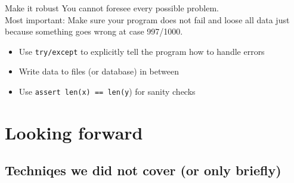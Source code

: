 \begin{frame}{Make it robust}
	You cannot foresee every possible problem.\\
	Most important: Make sure your program does not fail and loose all data just because something goes wrong at case 997/1000.
	\begin{itemize}
		\item Use \texttt{try/except} to explicitly tell the program how to handle errors
		\item Write data to files (or database) in between
		\item Use \texttt{assert len(x) == len(y}) for sanity checks
	\end{itemize}	
\end{frame}




\section{Looking forward}
\subsection{Techniqes we did not cover (or only briefly)}



